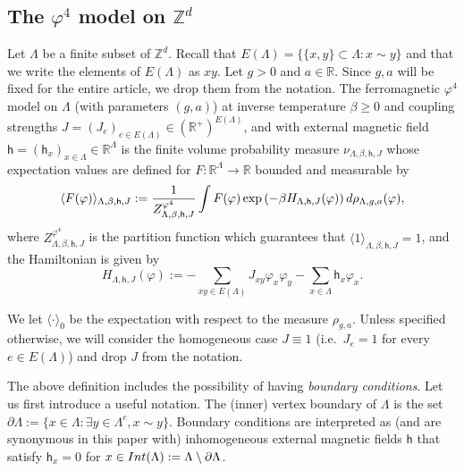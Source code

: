 \documentclass[11pt,a4paper]{article}
\theoremstyle{definition}
\numberwithin{equation}{section}
\begin{document}
\subsection{The $\varphi^4$ model on $\mathbb Z^d$}\label{sec:definition_phi4}

Let $\Lambda$ be a finite subset of $\mathbb Z^d$. Recall that $E(\Lambda)=\{\{x,y\}\subset \Lambda: x\sim y\}$ and that we write the elements of $E(\Lambda)$ as $xy$. Let $g>0$ and $a\in \mathbb R$. Since $g,a$ will be fixed for the entire article, we drop them from the notation. The ferromagnetic $\varphi^4$ model on $\Lambda$ (with parameters $(g,a)$) at inverse temperature $\beta\geq0$ and coupling strengths $J=(J_e)_{e\in E(\Lambda)} \in(\mathbb R^+)^{E(\Lambda)}$, and with external magnetic field $\mathsf{h}=(\mathsf{h}_x)_{x\in \Lambda}\in \mathbb R^\Lambda$ is the finite volume probability measure $\nu_{\Lambda,\beta,\mathsf{h},J}$ whose expectation values are defined for $F:\mathbb R^
\Lambda \rightarrow \mathbb R$ bounded and measurable by
\begin{equation}
    \langle F(\varphi)
    \rangle_{\Lambda,\beta,\mathsf{h},J}:=\frac{1}{Z^{\varphi^4}_{\Lambda,\beta,\mathsf{h},J}}\int F(\varphi)\exp\left(-\beta H_{\Lambda,\mathsf{h},J}(\varphi)\right) \textup{d}\rho_{\Lambda,g,a}(\varphi),
\end{equation}
where $Z^{\varphi^4}_{\Lambda,\beta,\mathsf{h},J}$ is the partition function which guarantees that $\langle 1\rangle_{\Lambda,\beta,\mathsf h,J}=1$, and the Hamiltonian is given by 
\begin{equation}
    H_{\Lambda,\mathsf{h},J}(\varphi):=-\sum_{xy\in E(\Lambda)}J_{xy}\varphi_x\varphi_y-\sum_{x\in \Lambda}\mathsf{h}_x\varphi_x.
\end{equation}

We let $\langle \cdot\rangle_0$ be the expectation with respect to the measure $\rho_{g,a}$. Unless specified otherwise, we will consider the homogeneous case $J\equiv 1$ (i.e.\ $J_e=1$ for every $e\in E(\Lambda)$) and drop $J$ from the notation.

The above definition includes the possibility of having \emph{boundary conditions}. Let us first introduce a useful notation. The (inner) vertex boundary of $\Lambda$ is the set $\partial \Lambda := \{ x \in \Lambda: \exists y \in \Lambda^c, x\sim y\}$.  Boundary conditions are interpreted as (and are synonymous in this paper with) inhomogeneous external magnetic fields $\mathsf h$ that satisfy $\mathsf{h}_x=0$ for $x\in {\rm Int}(\Lambda):=\Lambda\setminus \partial \Lambda$. 
\end{document}
